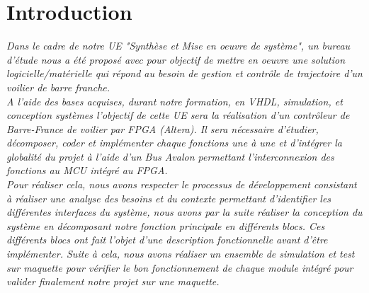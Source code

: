 \section*{Introduction}
\label{Introduction}
\textit{Dans le cadre de notre UE "Synthèse et Mise en oeuvre de système", un bureau d'étude nous a été proposé avec pour objectif de mettre en oeuvre une solution logicielle/matérielle qui répond au besoin de gestion et contrôle de trajectoire d'un voilier de barre franche.}\\

\textit{A l'aide des bases acquises, durant notre formation, en VHDL, simulation, et conception systèmes l'objectif de cette UE sera la réalisation d'un contrôleur de Barre-France de voilier par FPGA (Altera). Il sera nécessaire d'étudier, décomposer, coder et implémenter chaque fonctions une à une et d'intégrer la globalité du projet à l'aide d'un Bus Avalon permettant l'interconnexion des fonctions au MCU intégré au FPGA.}\\

\textit{Pour réaliser cela, nous avons respecter le processus de développement consistant à réaliser une analyse  des besoins et du contexte permettant d'identifier les différentes interfaces du système, nous avons par la suite réaliser la conception du système en décomposant notre fonction principale en différents blocs. Ces différents blocs ont fait l'objet d'une description fonctionnelle avant d'être implémenter. Suite à cela, nous avons réaliser un ensemble de simulation et test sur maquette pour vérifier le bon fonctionnement de chaque module intégré pour valider finalement notre projet sur une maquette.}
